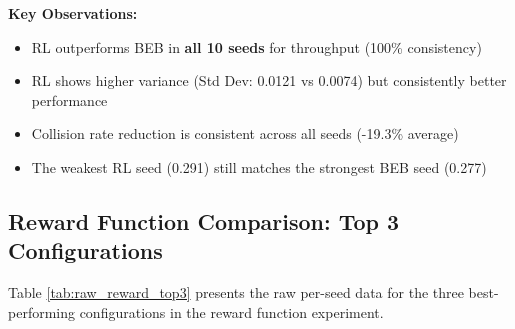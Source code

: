 \documentclass[12pt,a4paper,oneside]{article}
\theoremstyle{definition}
\begin{document}
\textbf{Key Observations:}
\begin{itemize}
    \item RL outperforms BEB in \textbf{all 10 seeds} for throughput (100\% consistency)
    \item RL shows higher variance (Std Dev: 0.0121 vs 0.0074) but consistently better performance
    \item Collision rate reduction is consistent across all seeds (-19.3\% average)
    \item The weakest RL seed (0.291) still matches the strongest BEB seed (0.277)
\end{itemize}

\subsection{Reward Function Comparison: Top 3 Configurations}

Table \ref{tab:raw_reward_top3} presents the raw per-seed data for the three best-performing configurations in the reward function experiment.
\end{document}
